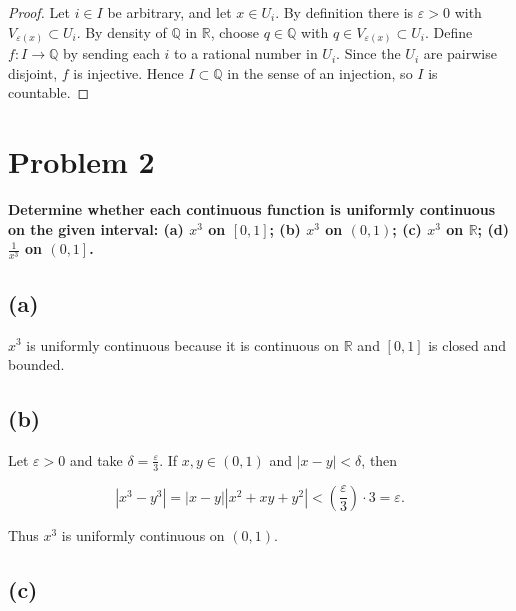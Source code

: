 \begin{proof}

Let \(i \in I\) be arbitrary, and let \(x \in U_{i}\). By definition there is \(\varepsilon > 0\) with \(V_{\varepsilon{(x)}} \subset U_{i}\). By density of \(\mathbb{Q}\) in \(\mathbb{R}\), choose \(q \in \mathbb{Q}\) with \(q \in V_{\varepsilon{(x)}} \subset U_{i}\). Define \(f:I\rightarrow\mathbb{Q}\) by sending each \(i\) to a rational number in \(U_{i}\). Since the \(U_{i}\) are pairwise disjoint, \(f\) is injective. Hence \(I \subset \mathbb{Q}\) in the sense of an injection, so \(I\) is countable.

\end{proof}

\section{Problem 2}

\textbf{Determine whether each continuous function is uniformly continuous on the given interval: (a) \(x^{3}\) on \(\left\lbrack {0,1} \right\rbrack\); (b) \(x^{3}\) on \(\left( {0,1} \right)\); (c) \(x^{3}\) on \(\mathbb{R}\); (d) \(\frac{1}{x^{3}}\) on \(\left( {0,1} \right\rbrack\).}

\subsection{(a)}

\(x^{3}\) is uniformly continuous because it is continuous on \(\mathbb{R}\) and \(\left\lbrack {0,1} \right\rbrack\) is closed and bounded.

\subsection{(b)}

Let \(\varepsilon > 0\) and take \(\delta = \frac{\varepsilon}{3}\). If \(x,y \in \left( {0,1} \right)\) and \(\left| {x - y} \right| < \delta\), then

\[\left| {x^{3} - y^{3}} \right| = \left| {x - y} \right|\left| {x^{2} + xy + y^{2}} \right| < \left( \frac{\varepsilon}{3} \right) \cdot 3 = \varepsilon.\]

Thus \(x^{3}\) is uniformly continuous on \(\left( {0,1} \right)\).

\subsection{(c)}

